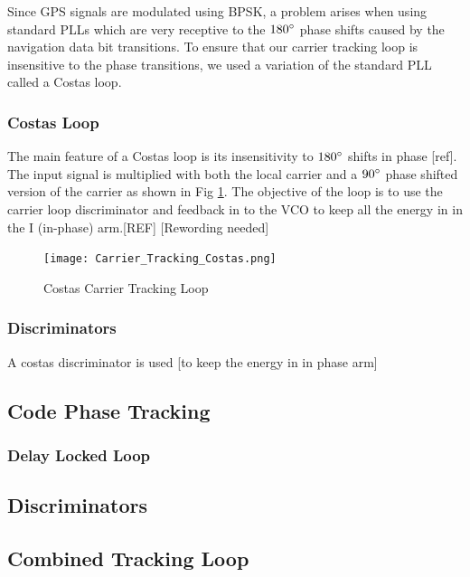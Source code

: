 \documentclass[11pt]{article}
\numberwithin{equation}{subsection}
\begin{document}
	Since GPS signals are modulated using BPSK, a problem arises when using standard PLLs which are very receptive to the $180\degree$ phase shifts caused by the navigation data bit transitions.
	To ensure that our carrier tracking loop is insensitive to the phase transitions, we used a variation of the standard PLL called a Costas loop.
	
	\subsubsection{Costas Loop}
	
	The main feature of a Costas loop is its insensitivity to $180\degree$ shifts in phase [ref]. The input signal is multiplied with both the local carrier and a $90\degree$ phase shifted version of the carrier as shown in Fig \ref{Costas Carrier Tracking Loop}. The objective of the loop is to use the carrier loop discriminator and feedback in to the VCO  to keep all the energy in in the I (in-phase) arm.[REF] [Rewording needed]
	
	
	
	\begin{figure}[H]
		\centering
		\texttt{[image: Carrier\_Tracking\_Costas.png]}
		\caption{Costas Carrier Tracking Loop}
		\label{Costas Carrier Tracking Loop}
	\end{figure}
	
	
	\subsubsection{Discriminators}
	
	A costas discriminator is used [to keep the energy in in phase arm] 
	
	
	\subsection{Code Phase Tracking}
	
	\subsubsection{Delay Locked Loop}
	
	\subsection{Discriminators}
	
	\subsection{Combined Tracking Loop}
	
\end{document}
